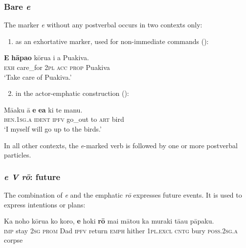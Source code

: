 \subsubsection[Bare e]{Bare \textit{e}}\label{sec:7.2.5.2}

The  marker \textit{e} without any postverbal  occurs in two contexts only: 

\begin{enumerate}
\item
as an exhortative marker, used for non-immediate commands ():
\end{enumerate}

\ea\label{ex:7.26}
\gll \textbf{E} \textbf{hāpa{\ꞌ}o} kōrua i a Puakiva. \\
\textsc{exh} care\_for \textsc{2pl} \textsc{acc} \textsc{prop} Puakiva \\

\glt
‘Take care of Puakiva.’ \textstyleExampleref{[R229.420–421]}
\z

\begin{enumerate}
\setcounter{enumi}{1} 
\item
in the  actor-emphatic construction ():
\end{enumerate}
\ea\label{ex:7.27}
\gll Mā{\ꞌ}aku {\ꞌ}ā \textbf{e} \textbf{e{\ꞌ}a} ki te manu. \\
\textsc{ben.1sg.a} \textsc{ident} \textsc{ipfv} go\_out to \textsc{art} bird \\

\glt
‘I myself will go up to the birds.’ \textstyleExampleref{[Egt-01.014]}
\z

In all other contexts, the \textit{e}{}-marked verb is followed by one or more postverbal particles.

\subsubsection{\textit{e V rō}: future}\label{sec:7.2.5.3}
The combination of  \textit{e} and the emphatic  \textit{rō} expresses future events. It is used to express intentions or plans:

\ea\label{ex:7.28}
\gll Ka noho kōrua ko koro, \textbf{e} hoki \textbf{rō} mai mātou ka muraki tā{\ꞌ}au pāpaku.\\
\textsc{imp} stay \textsc{2sg} \textsc{prom} Dad \textsc{ipfv} return \textsc{emph} hither \textsc{1pl.excl} \textsc{cntg} bury \textsc{poss.2sg.a} corpse\\

